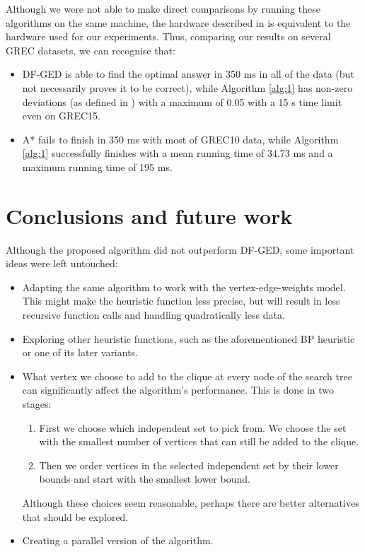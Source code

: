 \documentclass{article}
\theoremstyle{definition}
\begin{document}
Although we were not able to make direct comparisons by running these algorithms on the same machine, the hardware described in \cite{abu-aisheh_raveaux_ramel_martineau_2015} is equivalent to the hardware used for our experiments. Thus, comparing our results on several GREC datasets, we can recognise that:
\begin{itemize}
\item DF-GED is able to find the optimal answer in 350 ms in all of the data (but not necessarily proves it to be correct), while Algorithm \ref{alg:1} has non-zero deviations (as defined in \cite{abu-aisheh_raveaux_ramel_martineau_2015}) with a maximum of 0.05 with a 15 s time limit even on GREC15.
\item A* fails to finish in 350 ms with most of GREC10 data, while Algorithm \ref{alg:1} successfully finishes with a mean running time of 34.73 ms and a maximum running time of 195 ms.
\end{itemize}
\section{Conclusions and future work}
Although the proposed algorithm did not outperform DF-GED, some important ideas were left untouched:
\begin{itemize}
\item Adapting the same algorithm to work with the vertex-edge-weights model. This might make the heuristic function less precise, but will result in less recursive function calls and handling quadratically less data.
\item Exploring other heuristic functions, such as the aforementioned BP heuristic or one of its later variants.
\item What vertex we choose to add to the clique at every node of the search tree can significantly affect the algorithm's performance. This is done in two stages:
  \begin{enumerate}
  \item First we choose which independent set to pick from. We choose the set with the smallest number of vertices that can still be added to the clique.
  \item Then we order vertices in the selected independent set by their lower bounds and start with the smallest lower bound.
  \end{enumerate}
  Although these choices seem reasonable, perhaps there are better alternatives that should be explored.
\item Creating a parallel version of the algorithm.
\end{itemize}
\printbibliography
\end{document}
